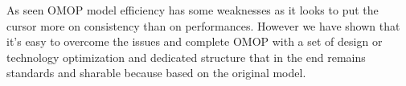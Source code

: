 As seen OMOP model efficiency has some weaknesses as it looks to put the cursor
more on consistency than on performances. However we have shown that it's easy
to overcome the issues and complete OMOP with a set of design or technology
optimization and dedicated structure that in the end remains standards and
sharable because based on the original model.

